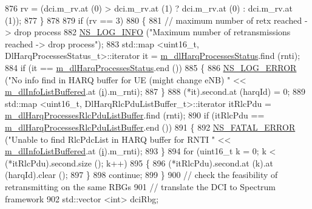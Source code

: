\begin{DoxyCode}
876               rv = (dci.m\_rv.at (0) > dci.m\_rv.at (1) ? dci.m\_rv.at (0) : dci.m\_rv.at (1));
877             \}
878 
879           \textcolor{keywordflow}{if} (rv == 3)
880             \{
881               \textcolor{comment}{// maximum number of retx reached -> drop process}
882               \hyperlink{group__logging_gafbd73ee2cf9f26b319f49086d8e860fb}{NS\_LOG\_INFO} (\textcolor{stringliteral}{"Maximum number of retransmissions reached -> drop process"});
883               std::map <uint16\_t, DlHarqProcessesStatus\_t>::iterator it = 
      \hyperlink{classns3_1_1PfFfMacScheduler_a438c2319e01eaac65f64cbd82b3e8089}{m\_dlHarqProcessesStatus}.find (rnti);
884               \textcolor{keywordflow}{if} (it == \hyperlink{classns3_1_1PfFfMacScheduler_a438c2319e01eaac65f64cbd82b3e8089}{m\_dlHarqProcessesStatus}.end ())
885                 \{
886                   \hyperlink{group__logging_ga0261a8db1d4ac5f79417d117634fd455}{NS\_LOG\_ERROR} (\textcolor{stringliteral}{"No info find in HARQ buffer for UE (might change eNB) "} << 
      \hyperlink{classns3_1_1PfFfMacScheduler_af3c266623addc28fc6ecd97901183a2f}{m\_dlInfoListBuffered}.at (\hyperlink{bernuolliDistribution_8m_a6f6ccfcf58b31cb6412107d9d5281426}{i}).m\_rnti);
887                 \}
888               (*it).second.at (harqId) = 0;
889               std::map <uint16\_t, DlHarqRlcPduListBuffer\_t>::iterator itRlcPdu =  
      \hyperlink{classns3_1_1PfFfMacScheduler_acf9952b5bb3d26644b5e25054ca6e385}{m\_dlHarqProcessesRlcPduListBuffer}.find (rnti);
890               \textcolor{keywordflow}{if} (itRlcPdu == \hyperlink{classns3_1_1PfFfMacScheduler_acf9952b5bb3d26644b5e25054ca6e385}{m\_dlHarqProcessesRlcPduListBuffer}.end ())
891                 \{
892                   \hyperlink{group__fatal_ga5131d5e3f75d7d4cbfd706ac456fdc85}{NS\_FATAL\_ERROR} (\textcolor{stringliteral}{"Unable to find RlcPdcList in HARQ buffer for RNTI "} << 
      \hyperlink{classns3_1_1PfFfMacScheduler_af3c266623addc28fc6ecd97901183a2f}{m\_dlInfoListBuffered}.at (\hyperlink{bernuolliDistribution_8m_a6f6ccfcf58b31cb6412107d9d5281426}{i}).m\_rnti);
893                 \}
894               \textcolor{keywordflow}{for} (uint16\_t k = 0; k < (*itRlcPdu).second.size (); k++)
895                 \{
896                   (*itRlcPdu).second.at (k).at (harqId).clear ();
897                 \}
898               \textcolor{keywordflow}{continue};
899             \}
900           \textcolor{comment}{// check the feasibility of retransmitting on the same RBGs}
901           \textcolor{comment}{// translate the DCI to Spectrum framework}
902           std::vector <int> dciRbg;

\end{DoxyCode}
